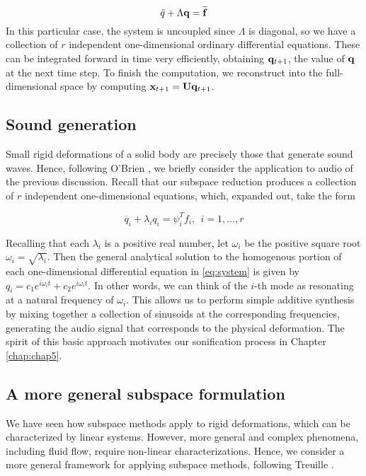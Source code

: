 {\begin{equation}
\ddot{q} + \Lambda \mathbf{q} = \widetilde{\mathbf{f}}
\end{equation}
In this particular case, the system is uncoupled since $\Lambda$ is diagonal, so we have a collection of $r$ independent one-dimensional ordinary differential equations. These can be integrated forward in time very efficiently, obtaining $\mathbf{q}_{t+1}$, the value of $\mathbf{q}$ at the next time step. To finish the computation, we reconstruct into the full-dimensional space by computing $\mathbf{x}_{t+1} = \mathbf{U} \mathbf{q}_{t+1}$.

\subsection{Sound generation}
Small rigid deformations of a solid body are precisely those that generate sound waves. Hence, following O'Brien \cite{O'Brien:2001:SSP:945191.945250}, we briefly consider the application to audio of the previous discussion. Recall that our subspace reduction produces a collection of $r$ independent one-dimensional equations, which, expanded out, take the form

\begin{equation}
\label{eq:system}
\ddot{q_i} + \lambda_i q_i = \psi_i^{T} f_i, \ \ i = 1, \dots, r
\end{equation}

Recalling that each $\lambda_i$ is a positive real number, let $\omega_i$ be the positive square root $\omega_i = \sqrt{\lambda_i}$. Then the general analytical solution to the homogenous portion of each one-dimensional differential equation in \ref{eq:system} is given by $q_i = c_1 e^{i \omega_i t} + c_2 e^{i \omega_i t}$. In other words, we can think of the $i$-th mode as resonating at a natural frequency of $\omega_i$. This allows us to perform simple additive synthesis by mixing together a collection of sinusoids at the corresponding frequencies, generating the audio signal that corresponds to the physical deformation. The spirit of this basic approach motivates
our sonification process in Chapter \ref{chap:chap5}.

\subsection{A more general subspace formulation}
\label{sec:general-subspace}
We have seen how subspace methods apply to rigid deformations, which can be characterized by linear systems. However, more general and complex phenomena, including fluid flow, require non-linear characterizations. Hence, we consider a more general framework for applying subspace methods, following Treuille 
\cite{Treuille:2006:MRF}.

}
